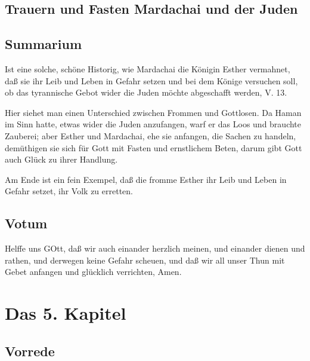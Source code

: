 \section{Trauern und Fasten Mardachai und der Juden}


\section{Summarium}

Ist eine solche, schöne Historig, wie Mardachai die Königin Esther vermahnet, daß sie ihr Leib und Leben in Gefahr setzen und bei dem Könige versuchen soll, ob das tyrannische Gebot wider die Juden möchte abgeschafft werden, V. 13.

Hier siehet man einen Unterschied zwischen Frommen und Gottlosen. Da Haman im Sinn hatte, etwas wider die Juden anzufangen, warf er das Loos und brauchte Zauberei; aber Esther und Mardachai, ehe sie anfangen, die Sachen zu handeln, demüthigen sie sich für Gott mit Fasten und ernstlichem Beten, darum gibt Gott auch Glück zu ihrer Handlung.

Am Ende ist ein fein Exempel, daß die fromme Esther ihr Leib und Leben in Gefahr setzet, ihr Volk zu erretten.

\section{Votum}

Helffe uns GOtt, daß wir auch einander herzlich meinen, und einander dienen und rathen, und derwegen keine Gefahr scheuen, und daß wir all unser Thun mit Gebet anfangen und glücklich verrichten, Amen.

\chapter{Das 5. Kapitel}

\section{Vorrede}

